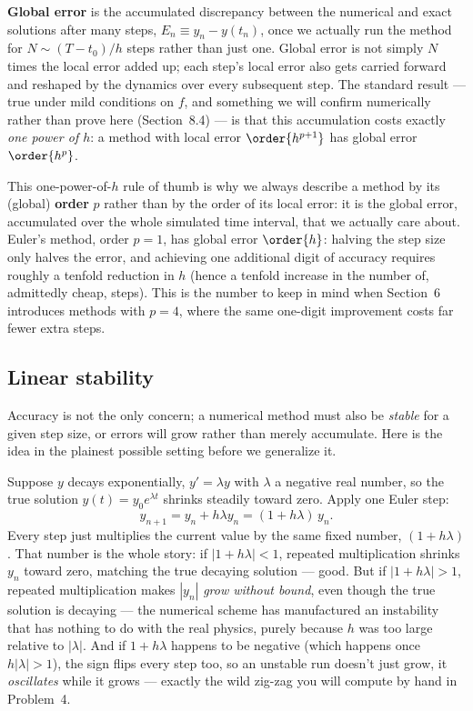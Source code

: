 \textbf{Global error} is the accumulated discrepancy between the numerical and exact solutions after many steps, $E_n \equiv y_n - y(t_n)$, once we actually run the method for $N \sim (T-t_0)/h$ steps rather than just one. Global error is not simply $N$ times the local error added up; each step's local error also gets carried forward and reshaped by the dynamics over every subsequent step. The standard result --- true under mild conditions on $f$, and something we will confirm numerically rather than prove here (Section~8.4) --- is that this accumulation costs exactly \emph{one power of $h$}: a method with local error $\order{h^{p+1}}$ has global error $\order{h^p}$.

\begin{remark}
This one-power-of-$h$ rule of thumb is why we always describe a method by its (global) \textbf{order} $p$ rather than by the order of its local error: it is the global error, accumulated over the whole simulated time interval, that we actually care about. Euler's method, order $p=1$, has global error $\order{h}$: halving the step size only halves the error, and achieving one additional digit of accuracy requires roughly a tenfold reduction in $h$ (hence a tenfold increase in the number of, admittedly cheap, steps). This is the number to keep in mind when Section~6 introduces methods with $p=4$, where the same one-digit improvement costs far fewer extra steps.
\end{remark}

\subsection{Linear stability}

Accuracy is not the only concern; a numerical method must also be \emph{stable} for a given step size, or errors will grow rather than merely accumulate. Here is the idea in the plainest possible setting before we generalize it.

Suppose $y$ decays exponentially, $y'=\lambda y$ with $\lambda$ a negative real number, so the true solution $y(t)=y_0 e^{\lambda t}$ shrinks steadily toward zero. Apply one Euler step:
\begin{equation}
y_{n+1} = y_n + h\lambda y_n = (1+h\lambda)\,y_n.
\end{equation}
Every step just multiplies the current value by the same fixed number, $(1+h\lambda)$. That number is the whole story: if $|1+h\lambda| < 1$, repeated multiplication shrinks $y_n$ toward zero, matching the true decaying solution --- good. But if $|1+h\lambda|>1$, repeated multiplication makes $|y_n|$ \emph{grow without bound}, even though the true solution is decaying --- the numerical scheme has manufactured an instability that has nothing to do with the real physics, purely because $h$ was too large relative to $|\lambda|$. And if $1+h\lambda$ happens to be negative (which happens once $h|\lambda|>1$), the sign flips every step too, so an unstable run doesn't just grow, it \emph{oscillates} while it grows --- exactly the wild zig-zag you will compute by hand in Problem~4.

